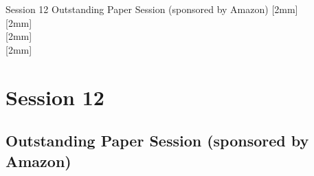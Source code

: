 \clearpage
{}
\renewcommand{\arraystretch}{1.5}
\begin{OneSessionOverview}{Session 12}{\daydateyear}
  {Outstanding Paper Session (sponsored by Amazon)}{}
  [2mm]
  \\
  \hline
  [2mm]
  \\
  \hline
  [2mm]
  \\
  \hline
  [2mm]
  \\
\end{OneSessionOverview}

\newpage
\section*{Session 12}
\subsection{Outstanding Paper Session (sponsored by Amazon)}
\TrackALoc\hfill{}
\clearpage


